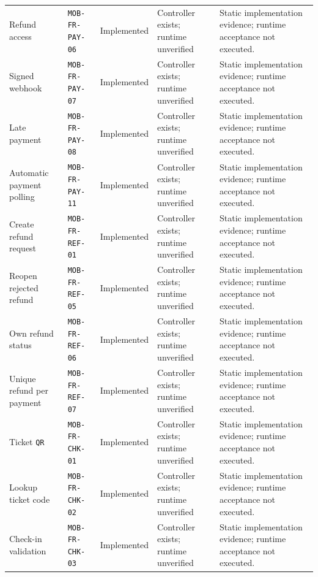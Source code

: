\begin{longtable}{@{}P{0.19000\SRSWidth}P{0.18000\SRSWidth}P{0.15000\SRSWidth}P{0.20000\SRSWidth}P{0.28000\SRSWidth}@{}}
Refund access & \texttt{MOB-\allowbreak{}FR-\allowbreak{}PAY-\allowbreak{}06} & Implemented & Controller exists; runtime unverified & Static implementation evidence; runtime acceptance not executed. \\[3pt]
Signed webhook & \texttt{MOB-\allowbreak{}FR-\allowbreak{}PAY-\allowbreak{}07} & Implemented & Controller exists; runtime unverified & Static implementation evidence; runtime acceptance not executed. \\[3pt]
Late payment & \texttt{MOB-\allowbreak{}FR-\allowbreak{}PAY-\allowbreak{}08} & Implemented & Controller exists; runtime unverified & Static implementation evidence; runtime acceptance not executed. \\[3pt]
Automatic payment polling & \texttt{MOB-\allowbreak{}FR-\allowbreak{}PAY-\allowbreak{}11} & Implemented & Controller exists; runtime unverified & Static implementation evidence; runtime acceptance not executed. \\[3pt]
Create refund request & \texttt{MOB-\allowbreak{}FR-\allowbreak{}REF-\allowbreak{}01} & Implemented & Controller exists; runtime unverified & Static implementation evidence; runtime acceptance not executed. \\[3pt]
Reopen rejected refund & \texttt{MOB-\allowbreak{}FR-\allowbreak{}REF-\allowbreak{}05} & Implemented & Controller exists; runtime unverified & Static implementation evidence; runtime acceptance not executed. \\[3pt]
Own refund status & \texttt{MOB-\allowbreak{}FR-\allowbreak{}REF-\allowbreak{}06} & Implemented & Controller exists; runtime unverified & Static implementation evidence; runtime acceptance not executed. \\[3pt]
Unique refund per payment & \texttt{MOB-\allowbreak{}FR-\allowbreak{}REF-\allowbreak{}07} & Implemented & Controller exists; runtime unverified & Static implementation evidence; runtime acceptance not executed. \\[3pt]
Ticket \texttt{QR} & \texttt{MOB-\allowbreak{}FR-\allowbreak{}CHK-\allowbreak{}01} & Implemented & Controller exists; runtime unverified & Static implementation evidence; runtime acceptance not executed. \\[3pt]
Lookup ticket code & \texttt{MOB-\allowbreak{}FR-\allowbreak{}CHK-\allowbreak{}02} & Implemented & Controller exists; runtime unverified & Static implementation evidence; runtime acceptance not executed. \\[3pt]
Check-in validation & \texttt{MOB-\allowbreak{}FR-\allowbreak{}CHK-\allowbreak{}03} & Implemented & Controller exists; runtime unverified & Static implementation evidence; runtime acceptance not executed. \\[3pt]

\end{longtable}
